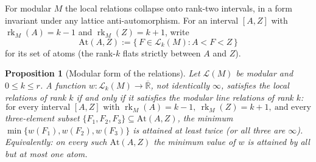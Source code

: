 \documentclass{article}
\newtheorem{proposition}[theorem]{Proposition}
\theoremstyle{definition}
\newcommand{\Rbar}{\overline{\mathbb{R}}}
\newcommand{\rk}{\operatorname{rk}}
\newcommand{\cLL}{\mathcal{L}}
\begin{document}
For modular $M$ the local relations collapse onto rank-two intervals, in a form invariant under any
lattice anti-automorphism. For an interval $[A,Z]$ with $\rk_M(A)=k-1$ and $\rk_M(Z)=k+1$, write
\[
  \mathrm{At}(A,Z):=\{\,F\in\cLL_k(M):A<F<Z\,\}
\]
for its set of atoms (the rank-$k$ flats strictly between $A$ and $Z$).

\begin{proposition}[Modular form of the relations]\label{prop:modline}
Let $\cLL(M)$ be modular and $0\le k\le r$. A function $w\colon\cLL_k(M)\to\Rbar$, not identically
$\infty$, satisfies the local relations of rank $k$ if and only if it satisfies the \emph{modular
line relations of rank $k$}:
\begin{equation}\label{eqn:modline}
  \text{for every interval }[A,Z]\text{ with }\rk_M(A)=k-1,\ \rk_M(Z)=k+1,\ \text{and every}
\end{equation}
three-element subset $\{F_1,F_2,F_3\}\subseteq\mathrm{At}(A,Z)$, the minimum
$\min\{w(F_1),w(F_2),w(F_3)\}$ is attained at least twice (or all three are $\infty$). Equivalently:
on every such $\mathrm{At}(A,Z)$ the minimum value of $w$ is attained by all but at most one atom.
\end{proposition}
\end{document}
